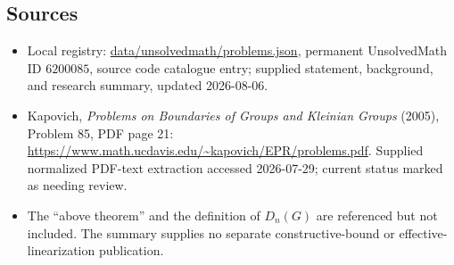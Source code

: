 \documentclass[11pt]{article}
\begin{document}
\subsection{Sources}
\begin{itemize}
\item Local registry: \url{data/unsolvedmath/problems.json}, permanent UnsolvedMath ID \(6200085\), source code catalogue entry; supplied statement, background, and research summary, updated 2026-08-06.
\item Kapovich, \emph{Problems on Boundaries of Groups and Kleinian Groups} (2005), Problem 85, PDF page 21: \url{https://www.math.ucdavis.edu/~kapovich/EPR/problems.pdf}. Supplied normalized PDF-text extraction accessed 2026-07-29; current status marked as needing review.
\item The ``above theorem'' and the definition of \(D_n(G)\) are referenced but not included. The summary supplies no separate constructive-bound or effective-linearization publication.
\end{itemize}
\end{document}
